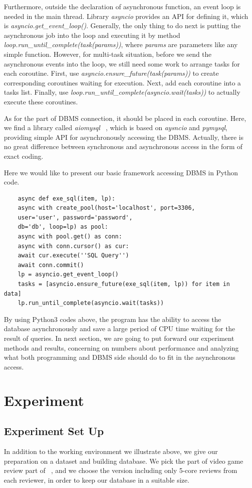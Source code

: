 \documentclass[onecolumn, conference, 12pt]{IEEEtran}
\begin{document}
	Furthermore, outside the declaration of asynchronous function, an event loop is needed in the main thread. Library \textit{asyncio} provides an API for defining it, which is \textit{asyncio.get\_event\_loop()}. Generally, the only thing to do next is putting the asynchronous job into the loop and executing it by method \textit{loop.run\_until\_complete(task(params))}, where \textit{params} are parameters like any simple function. However, for multi-task situation, before we send the asynchronous events into the loop, we still need some work to arrange tasks for each coroutine. First, use \textit{asyncio.ensure\_future(task(params))} to create corresponding coroutines waiting for execution. Next, add each coroutine into a tasks list. Finally, use \textit{loop.run\_until\_complete(asyncio.wait(tasks))} to actually execute these coroutines.
	
	As for the part of DBMS connection, it should be placed in each coroutine. Here, we find a library called \textit{aiomysql} ~\cite{aiomysql}, which is based on \textit{aysncio} and \textit{pymysql}, providing simple API for asynchronously accessing the DBMS. Actually, there is no great difference between synchronous and asynchronous access in the form of exact coding. 
	
	Here we would like to present our basic framework accessing DBMS in Python code.
	\lstset{language=python,tabsize=2}
	\begin{lstlisting}
	async def exe_sql(item, lp):
	async with create_pool(host='localhost', port=3306,
	user='user', password='password',
	db='db', loop=lp) as pool:
	async with pool.get() as conn:
	async with conn.cursor() as cur:
	await cur.execute(''SQL Query'')
	await conn.commit()
	lp = asyncio.get_event_loop()
	tasks = [asyncio.ensure_future(exe_sql(item, lp)) for item in data]
	lp.run_until_complete(asyncio.wait(tasks))
	\end{lstlisting}
	
	By using Python3 codes above, the program has the ability to access the database asynchronously and save a large period of CPU time waiting for the result of queries. In next section, we are going to put forward our experiment methods and results, concerning on numbers about performance and analyzing what both programming and DBMS side should do to fit in the asynchronous access. 
	\section{Experiment}
	\subsection{Experiment Set Up}
	In addition to the working environment we illustrate above, we give our preparation on a dataset and building database. 
	We pick the part of video game review part of ~\cite{Amazon}, and we choose the version including only 5-core reviews from each reviewer, in order to keep our database in a suitable size. 
	
\end{document}
